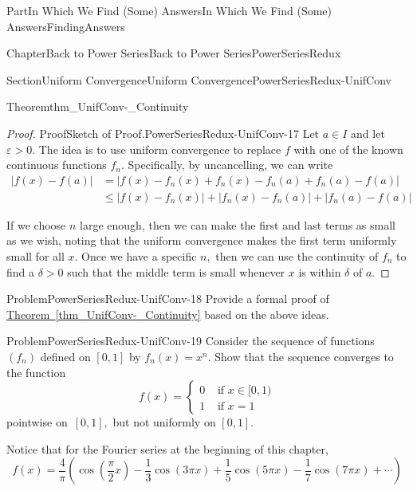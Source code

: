 \documentclass[oneside,10pt,]{book}
\newcommand{\xreffont}{\relax}
\numberwithin{equation}{part}
\newcommand{\eps}{\varepsilon}
\newcommand{\amp}{&}
\begin{document}
\begin{partptx}{Part}{In Which We Find (Some) Answers}{}{In Which We Find (Some) Answers}{}{}{FindingAnswers}
\begin{chapterptx}{Chapter}{Back to Power Series}{}{Back to Power Series}{}{}{PowerSeriesRedux}
\begin{sectionptx}{Section}{Uniform Convergence}{}{Uniform Convergence}{}{}{PowerSeriesRedux-UnifConv}
\begin{theorem}{Theorem}{}{}{thm_UnifConv-_Continuity}
\end{theorem}
\begin{proof}{Proof}{Sketch of Proof.}{PowerSeriesRedux-UnifConv-17}
Let \(a\in I\) and let \(\eps>0\).  The idea is to use uniform convergence to replace \(f\) with one of the known continuous functions \(f_n\).  Specifically, by uncancelling, we can write%
\begin{align*}
\left|f(x)-f(a)\right|\amp =\left|f(x)-f_n(x)+f_n(x)-f_n(a)+f_n(a)-f(a)\right|\\
\amp \leq \left|f(x)-f_n(x)\right|+\left|f_n(x)-f_n(a)\right|+\left|f_n(a)-f(a)\right|
\end{align*}
%
\par
If we choose \(n\) large enough, then we can make the first and last terms as small as we wish, noting that the uniform convergence makes the first term uniformly small for all \(x\).  Once we have a specific \(n,\) then we can use the continuity of \(f_n\) to find a \(\delta>0\) such that the middle term is small whenever \(x\) is within \(\delta\) of \(a\).%
\end{proof}
\begin{problem}{Problem}{}{PowerSeriesRedux-UnifConv-18}%
 Provide a formal proof of \hyperref[thm_UnifConv-_Continuity]{Theorem~{\xreffont\ref{thm_UnifConv-_Continuity}}} based on the above ideas.%
\end{problem}
\begin{problem}{Problem}{}{PowerSeriesRedux-UnifConv-19}%
 Consider the sequence of functions \(\left(f_n\right)\) defined on \([0,1]\) by \(f_n(x)=x^n\).  Show that the sequence converges to the function%
\begin{equation*}
f(x)= \begin{cases}0\amp \text{ if  } x\in[0,1)\\ 1\amp \text{ if } x=1 \end{cases}
\end{equation*}
pointwise on \(\,[0,1],\) but not uniformly on \([0,1]\).%
\end{problem}
Notice that for the Fourier series at the beginning of this chapter,%
\begin{equation*}
f(x)=\frac{4}{\pi}\left(\cos\left(\frac{\pi}{2}x\right)-\frac{1}{3}\cos\left( 3\pi x\right)+\frac{1}{5}\cos\left(5\pi x\right)-\frac{1}{7}\cos\left(7\pi x\right)+\cdots\right)
\end{equation*}

\end{sectionptx}
\end{chapterptx}
\end{partptx}
\end{document}
